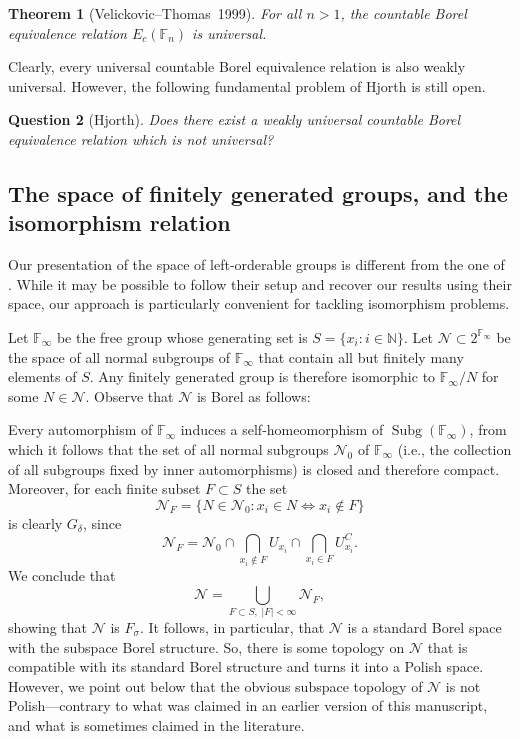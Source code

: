\documentclass{amsart}
\newtheorem{theorem}{Theorem}[section]
\newtheorem{question}[theorem]{Question}
\theoremstyle{definition}
\theoremstyle{remark}
\DeclareMathOperator{\Subg}{Subg}
\begin{document}
\begin{theorem}[Velickovic--Thomas~1999]
    For all \(n> 1\), the countable Borel equivalence relation \(E_c(\mathbb{F}_n)\) is universal.
\end{theorem}



Clearly, every universal countable Borel equivalence relation is also weakly universal. However, the following fundamental problem of Hjorth is still open.

\begin{question}[Hjorth]
    Does there exist a weakly universal countable Borel equivalence relation which is not universal?
\end{question}



\subsection{The space of finitely generated groups, and the isomorphism relation}
\label{subsec:fggroups}

Our presentation of the space of left-orderable groups is different from the one of \cite{GolKunLod, Osi21apal}. While it may be possible to follow their setup and recover our results using their space, our approach is particularly convenient for tackling isomorphism problems.

Let \(\mathbb{F}_\infty\) be the free group whose generating set is \(S= \{x_i: i\in \mathbb{N}\}\).
Let \(\mathcal{N} \subset 2^{\mathbb{F}_\infty}\) be the space of all normal subgroups of \(\mathbb{F}_\infty\) that contain all but finitely many elements of $S$.  Any finitely generated group is therefore isomorphic to \(\mathbb{F}_\infty/N\) for some \(N\in \mathcal{N}\).  Observe that $\mathcal{N}$ is Borel as follows:

Every automorphism of \(\mathbb{F}_\infty\) induces a self-homeomorphism of \(\Subg(\mathbb{F}_\infty)\),  from which it follows that the set of all normal subgroups $\mathcal{N}_0$ of $\mathbb{F}_\infty$ (i.e., the collection of all subgroups fixed by inner automorphisms) is closed and therefore compact.  Moreover, for each finite subset $F \subset S$ the set
$$\mathcal{N}_F = \{N \in \mathcal{N}_0 : x_i \in N \iff x_i \notin F \}$$
is clearly $G_\delta$, since
\[ \mathcal{N}_F = \mathcal{N}_0 \cap  \bigcap_{x_i \notin F} U_{x_i} \cap  \bigcap_{x_i \in F} U_{x_i}^C .
\]
We conclude that
\[ \mathcal{N} =  \bigcup_{F \subset S, \; |F|<\infty} \mathcal{N}_{F},
\]
showing that \(\mathcal{N}\) is $F_\sigma$. It follows, in particular, that \(\mathcal{N}\) is a standard Borel space with the subspace Borel structure. So, there is some topology on \(\mathcal{N}\) that is compatible with its standard Borel structure and turns it into a Polish space. However, we point out below that the obvious subspace topology of \(\mathcal{N}\) is not Polish---contrary to what was claimed in an earlier version of this manuscript, and what is sometimes claimed in the literature.
\end{document}
